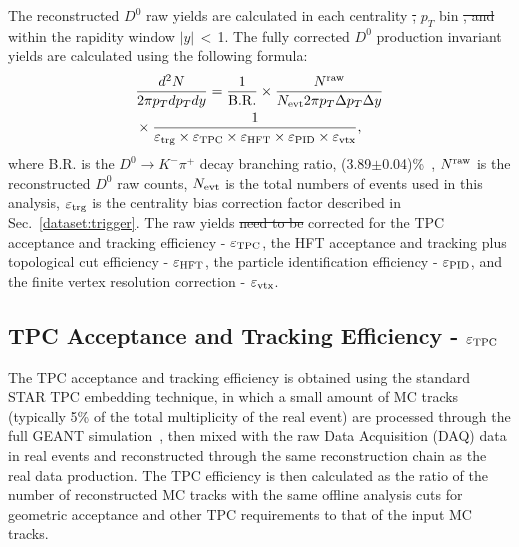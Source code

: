 \documentclass[%
 reprint,	
showpacs,
 amsmath,amssymb,
 aps,
 prc,
]{revtex4-1}
\providecommand{\DIFaddtex}[1]{{\protect\color{blue}\uwave{#1}}} %
\providecommand{\DIFdeltex}[1]{{\protect\color{red}\sout{#1}}}                      %
\providecommand{\DIFaddbegin}{} %
\providecommand{\DIFaddend}{} %
\providecommand{\DIFdelbegin}{} %
\providecommand{\DIFdelend}{} %
\providecommand{\DIFadd}[1]{\texorpdfstring{\DIFaddtex{#1}}{#1}} %
\providecommand{\DIFdel}[1]{\texorpdfstring{\DIFdeltex{#1}}{}} %
\begin{document}
The reconstructed $D^0$ raw yields are calculated in each centrality \DIFdelbegin \DIFdel{, }\DIFdelend \DIFaddbegin \DIFadd{and }\DIFaddend $p_{T}$ bin \DIFdelbegin \DIFdel{, and }\DIFdelend within the rapidity window $|y|$\,$<$\,1. The fully corrected $D^0$ production invariant yields are calculated using the following formula:
\begin{equation}
  \begin{aligned}
& \frac{d^2N}{2\pi p_{T}dp_{T}dy} = \frac{1}{\rm B.R.} \times \frac{N^{\rm raw}}{N_{\rm evt} 2\pi p_{T}\Delta p_{T}\Delta y} \\
& \times \frac{1}{\varepsilon_{\rm trg}\times\varepsilon_{\rm TPC}\times\varepsilon_{\rm HFT}\times\varepsilon_{\rm PID}\times\varepsilon_{\rm vtx}},
  \end{aligned}
\label{equ:invariantyield}
\end{equation}
where B.R. is the $D^0\rightarrow K^-\pi^+$ decay branching ratio, (3.89$\pm$0.04)\%~\cite{pdg}, $N^{\rm raw}$ is the reconstructed $D^0$ raw counts, $N_{\rm evt}$ is the total numbers of events used in this analysis, \DIFaddbegin \DIFadd{and }\DIFaddend $\varepsilon_{\rm trg}$ is the centrality bias correction factor described in Sec.~\ref{dataset:trigger}. The raw yields \DIFdelbegin \DIFdel{need to be }\DIFdelend \DIFaddbegin \DIFadd{are }\DIFaddend corrected for the TPC acceptance and tracking efficiency - $\varepsilon_{\rm TPC}$, the HFT acceptance and tracking plus topological cut efficiency - $\varepsilon_{\rm HFT}$, the particle identification efficiency - $\varepsilon_{\rm PID}$, and the finite vertex resolution correction - $\varepsilon_{\rm vtx}$.

\subsection{TPC Acceptance and Tracking Efficiency - $\varepsilon_{\rm TPC}$}
\label{correction:tpc}

The TPC acceptance and tracking efficiency is obtained using the standard STAR TPC embedding technique, in which a small amount of MC tracks (typically 5\% of the total multiplicity of the real event) are processed through the full GEANT simulation~\cite{GEANT3}, then mixed with the raw Data Acquisition (DAQ) data in real events and reconstructed through the same reconstruction chain as the real data production. The TPC efficiency is then calculated as the ratio of the number of reconstructed MC tracks with the same offline analysis cuts for geometric acceptance and other TPC requirements to that of the input MC tracks.
\end{document}
